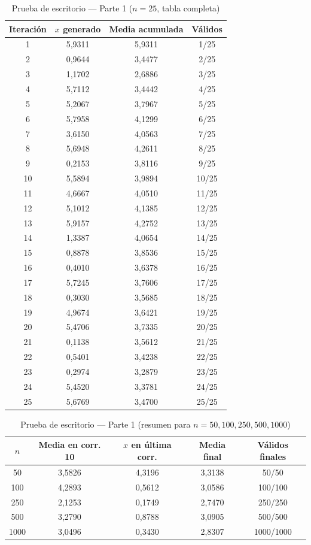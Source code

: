 \documentclass[12pt,a4paper]{article}
\begin{document}
\begin{table}[H]
\centering
\caption{Prueba de escritorio — Parte 1 ($n=25$, tabla completa)}
\small
\begin{tabular}{cccc}
\toprule
\textbf{Iteración} & \textbf{$x$ generado} & \textbf{Media acumulada} & \textbf{Válidos} \\
\midrule
1 & 5,9311 & 5,9311 & 1/25 \\
2 & 0,9644 & 3,4477 & 2/25 \\
3 & 1,1702 & 2,6886 & 3/25 \\
4 & 5,7112 & 3,4442 & 4/25 \\
5 & 5,2067 & 3,7967 & 5/25 \\
6 & 5,7958 & 4,1299 & 6/25 \\
7 & 3,6150 & 4,0563 & 7/25 \\
8 & 5,6948 & 4,2611 & 8/25 \\
9 & 0,2153 & 3,8116 & 9/25 \\
10 & 5,5894 & 3,9894 & 10/25 \\
11 & 4,6667 & 4,0510 & 11/25 \\
12 & 5,1012 & 4,1385 & 12/25 \\
13 & 5,9157 & 4,2752 & 13/25 \\
14 & 1,3387 & 4,0654 & 14/25 \\
15 & 0,8878 & 3,8536 & 15/25 \\
16 & 0,4010 & 3,6378 & 16/25 \\
17 & 5,7245 & 3,7606 & 17/25 \\
18 & 0,3030 & 3,5685 & 18/25 \\
19 & 4,9674 & 3,6421 & 19/25 \\
20 & 5,4706 & 3,7335 & 20/25 \\
21 & 0,1138 & 3,5612 & 21/25 \\
22 & 0,5401 & 3,4238 & 22/25 \\
23 & 0,2974 & 3,2879 & 23/25 \\
24 & 5,4520 & 3,3781 & 24/25 \\
25 & 5,6769 & 3,4700 & 25/25 \\
\bottomrule
\end{tabular}
\end{table}

\begin{table}[H]
\centering
\caption{Prueba de escritorio — Parte 1 (resumen para $n=50,100,250,500,1000$)}
\begin{tabular}{ccccc}
\toprule
\textbf{$n$} & \textbf{Media en corr. 10} & \textbf{$x$ en última corr.} & \textbf{Media final} & \textbf{Válidos finales} \\
\midrule
50 & 3,5826 & 4,3196 & 3,3138 & 50/50 \\
100 & 4,2893 & 0,5612 & 3,0586 & 100/100 \\
250 & 2,1253 & 0,1749 & 2,7470 & 250/250 \\
500 & 3,2790 & 0,8788 & 3,0905 & 500/500 \\
1000 & 3,0496 & 0,3430 & 2,8307 & 1000/1000 \\
\bottomrule
\end{tabular}
\end{table}
\end{document}
